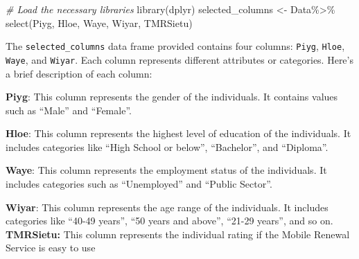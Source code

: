 \documentclass[
]{article}
\newenvironment{Shaded}{\begin{snugshade}}{\end{snugshade}}
\newcommand{\CommentTok}[1]{\textcolor[rgb]{0.56,0.35,0.01}{\textit{#1}}}
\newcommand{\FunctionTok}[1]{\textcolor[rgb]{0.00,0.00,0.00}{#1}}
\newcommand{\NormalTok}[1]{#1}
\newcommand{\OtherTok}[1]{\textcolor[rgb]{0.56,0.35,0.01}{#1}}
\newcommand{\SpecialCharTok}[1]{\textcolor[rgb]{0.00,0.00,0.00}{#1}}
\begin{document}
\begin{Shaded}
\begin{Highlighting}[]
\CommentTok{\# Load the necessary libraries}
\FunctionTok{library}\NormalTok{(dplyr)}
\NormalTok{selected\_columns }\OtherTok{\textless{}{-}}\NormalTok{ Data}\SpecialCharTok{\%\textgreater{}\%}
                    \FunctionTok{select}\NormalTok{(Piyg, Hloe, Waye, Wiyar, TMRSietu)}
\end{Highlighting}
\end{Shaded}

The \texttt{selected\_columns} data frame provided contains four
columns: \texttt{Piyg}, \texttt{Hloe}, \texttt{Waye}, and
\texttt{Wiyar}. Each column represents different attributes or
categories. Here's a brief description of each column:

\textbf{Piyg}: This column represents the gender of the individuals. It
contains values such as ``Male'' and ``Female''.

\textbf{Hloe}: This column represents the highest level of education of
the individuals. It includes categories like ``High School or below'',
``Bachelor'', and ``Diploma''.

\textbf{Waye}: This column represents the employment status of the
individuals. It includes categories such as ``Unemployed'' and ``Public
Sector''.

\textbf{Wiyar}: This column represents the age range of the individuals.
It includes categories like ``40-49 years'', ``50 years and above'',
``21-29 years'', and so on. \textbf{TMRSietu:} This column represents
the individual rating if the Mobile Renewal Service is easy to use

\begin{verbatim}
\end{verbatim}
\end{document}
